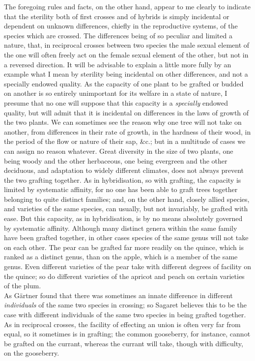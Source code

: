 \indent The foregoing rules and facts, on the other hand, appear to me clearly to indicate that the sterility both of first crosses and of hybrids is simply incidental or dependent on unknown differences, chiefly in the reproductive systems, of the species which are crossed. The differences being of so peculiar and limited a nature, that, in reciprocal crosses between two species the male sexual element of the one will often freely act on the female sexual element of the other, but not in a reversed direction. It will be advisable to explain a little more fully by an example what I mean by sterility being incidental on other differences, and not a specially endowed quality. As the capacity of one plant to be grafted or budded on another is so entirely unimportant for its welfare in a state of nature, I presume that no one will suppose that this capacity is a \emph{ specially} endowed quality, but will admit that it is incidental on differences in the laws of growth of the two plants. We can sometimes see the reason why one tree will not take on another, from differences in their rate of growth, in the hardness of their wood, in the period of the flow or nature of their sap, \&c.; but in a multitude of cases we can assign no reason whatever. Great diversity in the size of two plants, one being woody and the other herbaceous, one being evergreen and the other deciduous, and adaptation to widely different climates, does not always prevent the two grafting together. As in hybridisation, so with grafting, the capacity is limited by systematic affinity, for no one has been able to graft trees together belonging to quite distinct families; and, on the other hand, closely allied species, and varieties of the same species, can usually, but not invariably, be grafted with ease. But this capacity, as in hybridisation, is by no means absolutely governed by systematic affinity. Although many distinct genera within the same family have been grafted together, in other cases species of the same genus will not take on each other. The pear can be grafted far more readily on the quince, which is ranked as a distinct genus, than on the apple, which is a member of the same genus. Even different varieties of the pear take with different degrees of facility on the quince; so do different varieties of the apricot and peach on certain varieties of the plum.\\
\indent As G\"{a}rtner found that there was sometimes an innate difference in different \emph{individuals} of the same two species in crossing; so Sagaret believes this to be the case with different individuals of the same two species in being grafted together. As in reciprocal crosses, the facility of effecting an union is often very far from equal, so it sometimes is in grafting; the common gooseberry, for instance, cannot be grafted on the currant, whereas the currant will take, though with difficulty, on the gooseberry.\\
